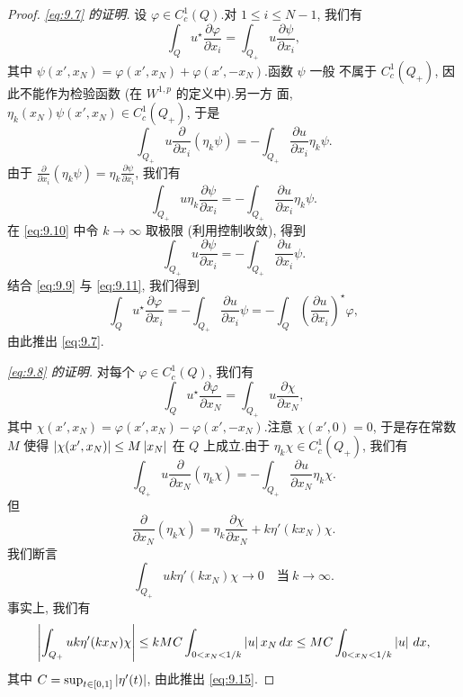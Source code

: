 \begin{proof}
\noindent\emph{\eqref{eq:9.7} 的证明.} 设 $\varphi\in C_c^1(Q)$.对
$1\le i\le N-1$, 我们有
\begin{equation}
\int_Q u^\star\frac{\partial\varphi}{\partial x_i}
=\int_{Q_+}u\frac{\partial\psi}{\partial x_i},
\label{eq:9.9}
\end{equation}
其中 $\psi(x',x_N)=\varphi(x',x_N)+\varphi(x',-x_N)$.函数 $\psi$ 一般
不属于 $C_c^1(Q_+)$, 因此不能作为检验函数 (在 $W^{1,p}$ 的定义中).另一方
面, $\eta_k(x_N)\psi(x',x_N)\in C_c^1(Q_+)$, 于是
\begin{equation*}
\int_{Q_+}u\frac{\partial}{\partial x_i}(\eta_k\psi)
=-\int_{Q_+}\frac{\partial u}{\partial x_i}\eta_k\psi.
\end{equation*}
由于 $\frac{\partial}{\partial x_i}(\eta_k\psi)=\eta_k
\frac{\partial\psi}{\partial x_i}$, 我们有
\begin{equation}
\int_{Q_+}u\eta_k\frac{\partial\psi}{\partial x_i}
=-\int_{Q_+}\frac{\partial u}{\partial x_i}\eta_k\psi.
\label{eq:9.10}
\end{equation}
在 \eqref{eq:9.10} 中令 $k\to\infty$ 取极限 (利用控制收敛), 得到
\begin{equation}
\int_{Q_+}u\frac{\partial\psi}{\partial x_i}
=-\int_{Q_+}\frac{\partial u}{\partial x_i}\psi.
\label{eq:9.11}
\end{equation}
结合 \eqref{eq:9.9} 与 \eqref{eq:9.11}, 我们得到
\begin{equation*}
\int_Q u^\star\frac{\partial\varphi}{\partial x_i}
=-\int_{Q_+}\frac{\partial u}{\partial x_i}\psi
=-\int_Q\left(\frac{\partial u}{\partial x_i}\right)^\star\varphi,
\end{equation*}
由此推出 \eqref{eq:9.7}.

\noindent\emph{\eqref{eq:9.8} 的证明.} 对每个 $\varphi\in C_c^1(Q)$, 我们有
\begin{equation}
\int_Q u^\star\frac{\partial\varphi}{\partial x_N}
=\int_{Q_+}u\frac{\partial\chi}{\partial x_N},
\label{eq:9.12}
\end{equation}
其中 $\chi(x',x_N)=\varphi(x',x_N)-\varphi(x',-x_N)$.注意
$\chi(x',0)=0$, 于是存在常数 $M$ 使得
$\left|\chi(x',x_N)\right|\le M\left|x_N\right|$ 在 $Q$ 上成立.由于
$\eta_k\chi\in C_c^1(Q_+)$, 我们有
\begin{equation}
\int_{Q_+}u\frac{\partial}{\partial x_N}(\eta_k\chi)
=-\int_{Q_+}\frac{\partial u}{\partial x_N}\eta_k\chi.
\label{eq:9.13}
\end{equation}
但
\begin{equation}
\frac{\partial}{\partial x_N}(\eta_k\chi)=\eta_k\frac{\partial\chi}
{\partial x_N}+k\eta'(kx_N)\chi.
\label{eq:9.14}
\end{equation}
我们断言
\begin{equation}
\int_{Q_+}uk\eta'(kx_N)\chi\to0\quad\text{当}\ k\to\infty.
\label{eq:9.15}
\end{equation}
事实上, 我们有
\begin{equation*}
\left|\int_{Q_+}uk\eta'(kx_N)\chi\right|
\le kMC\int_{0<x_N<1/k}\left|u\right|x_N\,dx
\le MC\int_{0<x_N<1/k}\left|u\right|\,dx,
\end{equation*}
其中 $C=\sup_{t\in[0,1]}\left|\eta'(t)\right|$, 由此推出 \eqref{eq:9.15}.


\end{proof}
